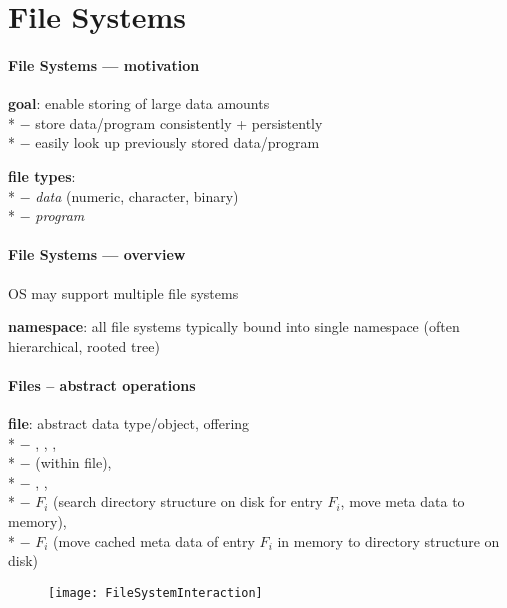\section{File Systems}

\paragraph{File Systems --- motivation}
\begin{items}
  \item \textbf{goal}: enable storing of large data amounts \\*
    $ - $ store data/program consistently + persistently \\*
    $ - $ easily look up previously stored data/program
  \item \textbf{file types}: \\*
    $ - $ \emph{data} (numeric, character, binary) \\*
    $ - $ \emph{program}
\end{items}

\paragraph{File Systems --- overview}
\begin{items}
  \item OS may support multiple file systems
  \item \textbf{namespace}: all file systems typically bound into single namespace (often hierarchical, rooted tree)
\end{items}

\paragraph{Files -- abstract operations}
\begin{items}
  \item \textbf{file}: abstract data type/object, offering \\*
    $ - $ , , , \\*
    $ - $  (within file), \\*
    $ - $ , , \\*
    $ - $ $ F_i $\code{)} (search directory structure on disk for entry $ F_i $, move meta data to memory),  \\*
    $ - $ $ F_i $\code{)} (move cached meta data of entry $ F_i $ in memory to directory structure on disk)
\end{items}
\begin{figure}[H]\centering\label{FileSystemInteraction}\texttt{[image: FileSystemInteraction]}\end{figure}

